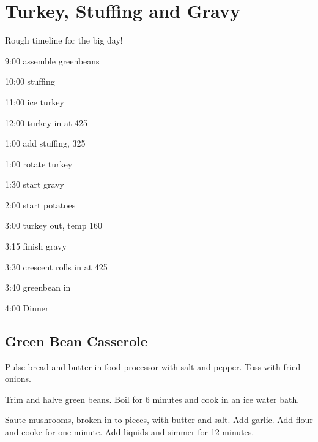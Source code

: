 \section{Turkey, Stuffing and Gravy}
\begin{recipe}

Rough timeline for the big day!

9:00 assemble greenbeans

10:00 stuffing

11:00 ice turkey

12:00 turkey in at 425

1:00 add stuffing, 325

1:00 rotate turkey

1:30 start gravy

2:00 start potatoes

3:00 turkey out, temp 160

3:15 finish gravy

3:30 crescent rolls in at 425

3:40 greenbean in

4:00 Dinner

\subsection{Green Bean Casserole}


Pulse bread and butter in food processor with salt and pepper. Toss with fried onions.


Trim and halve green beans. Boil for 6 minutes and cook in an ice water bath.


Saute mushrooms, broken in to pieces, with butter and salt. Add garlic. Add flour and cooke for one minute. Add liquids and simmer for 12 minutes.


\end{recipe}
